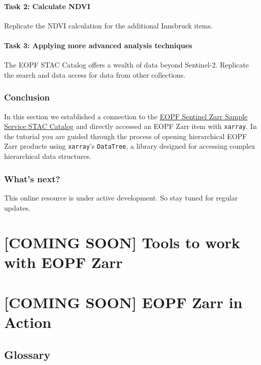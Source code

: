 \documentclass[
  letterpaper,
  DIV=11,
  numbers=noendperiod]{scrreprt}
\begin{document}
\subsection{Task 2: Calculate NDVI}\label{task-2-calculate-ndvi}

Replicate the NDVI calculation for the additional Innsbruck items.

\subsection{Task 3: Applying more advanced analysis
techniques}\label{task-3-applying-more-advanced-analysis-techniques}

The EOPF STAC Catalog offers a wealth of data beyond Sentinel-2.
Replicate the search and data access for data from other collections.

\section{Conclusion}\label{conclusion-8}

In this section we established a connection to the
\href{https://stac.browser.user.eopf.eodc.eu/?.language=en}{EOPF
Sentinel Zarr Sample Service STAC Catalog} and directly accessed an EOPF
Zarr item with \texttt{xarray}. In the tutorial you are guided through
the process of opening hierarchical EOPF Zarr products using
\texttt{xarray}'s \texttt{DataTree}, a library designed for accessing
complex hierarchical data structures.

\section{What's next?}\label{whats-next-8}

This online resource is under active development. So stay tuned for
regular updates.

\part{{[}COMING SOON{]} Tools to work with EOPF Zarr}

\part{{[}COMING SOON{]} EOPF Zarr in Action}


\chapter{\texorpdfstring{\textbf{Glossary}}{Glossary}}\label{glossary}
\end{document}
